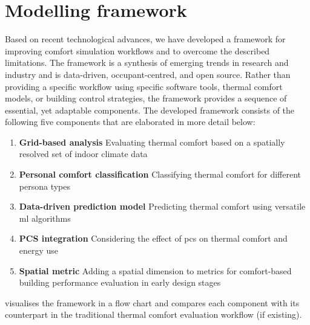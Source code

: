 
\section{Modelling framework}
\label{sec:modelling-framework}

Based on recent technological advances, we have developed a framework for improving comfort simulation workflows and to overcome the described limitations. The framework is a synthesis of emerging trends in research and industry and is data-driven, occupant-centred, and open source. Rather than providing a specific workflow using specific software tools, thermal comfort models, or building control strategies, the framework provides a sequence of essential, yet adaptable components. The developed framework consists of the following five components that are elaborated in more detail below:


\begin{enumerate}%

    \item \textbf{Grid-based analysis} \newline Evaluating thermal comfort based on a spatially resolved set of indoor climate data
    
    \item \textbf{Personal comfort classification} \newline Classifying thermal comfort for different persona types
    
    \item \textbf{Data-driven prediction model} \newline Predicting thermal comfort using versatile \gls{ml} algorithms
    
    \item \textbf{PCS integration} \newline Considering the effect of \gls{pcs} on thermal comfort and energy use
    
    \item \textbf{Spatial metric} \newline Adding a spatial dimension to metrics for comfort-based building performance evaluation in early design stages
    
\end{enumerate}


 visualises the framework in a flow chart and compares each component with its counterpart in the traditional thermal comfort evaluation workflow (if existing). 


